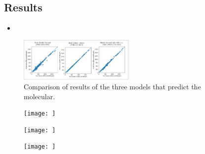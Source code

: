     \subsection{Results}
    \begin{itemize}
        \item 
    \end{itemize}
    \begin{figure}
        \centering
        \includegraphics[width=0.5\textwidth]{figures/graphs-Mol-Wei_Comp1.jpg}
        \caption{Comparison of results of the three models that predict the molecular.}
        \label{fig:comparison_mol_weight}
    \end{figure}
    \begin{figure}
        \centering
        \texttt{[image: ]}
        \caption{}
        \label{fig:model2-mol-weight-predictions}
    \end{figure}
    \begin{figure}
        \centering
        \texttt{[image: ]}
        \caption{}
        \label{fig:model20-mol-weight-loss}
    \end{figure}
    \begin{figure}
        \centering
        \texttt{[image: ]}
        \caption{}
        \label{fig:model20-mol-weight-predictions}
    \end{figure}